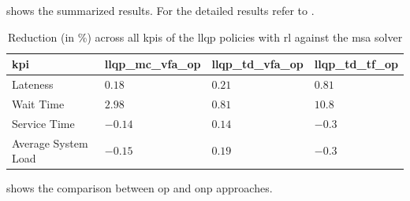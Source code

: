 \documentclass{seal_thesis}
\begin{document}
\begin{table}[!ht]
\centering
{}
\caption{Overview of developed \gls{llqp} policies with \gls{rl}}
\label{tab:rl_llqp_policies_overview}
\end{table}

 shows the summarized results. For the detailed results refer to .

\begin{table}[!ht]
\centering
\begin{tabular}{@{}llll@{}}
\toprule
\gls{kpi}                 & llqp\_mc\_vfa\_op & llqp\_td\_vfa\_op & llqp\_td\_tf\_op \\ \midrule
Lateness            & $0.18$                  & $0.21$                  & $0.81$                 \\
Wait Time           & $2.98$                  & $0.81$                  & $10.8$                 \\
Service Time        & $-0.14$                  & $0.14$                  & $-0.3$                 \\
Average System Load & $-0.15$                  & $0.19$                  & $-0.3$                 \\ \bottomrule
\end{tabular}
\caption{Reduction (in \%) across all \glspl{kpi} of the \gls{llqp} policies with \gls{rl} against the \gls{msa} solver}
\label{tab:rl_llqp_kpis_comp_gain}
\end{table}

 shows the comparison between \gls{op} and \gls{onp} approaches.
\end{document}
